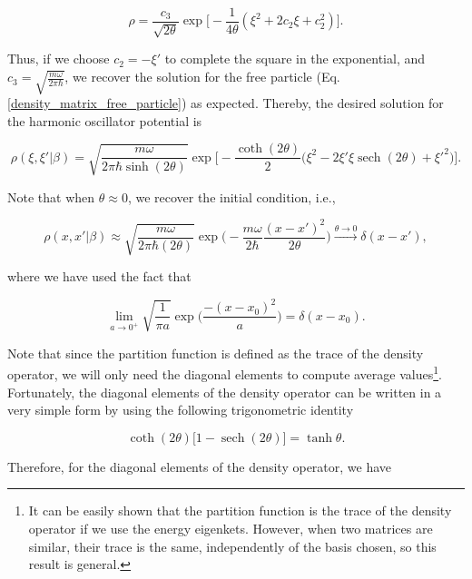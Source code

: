 \documentclass{article}
\DeclareMathOperator{\sech}{sech}
\begin{document}
\begin{equation}
    \rho = \frac{c_{3}}{\sqrt{2\theta}} \exp \big[ -\frac{1}{4\theta}(\xi^{2} + 2c_{2}\xi + c_{2}^{2}) \big].
\end{equation}

Thus, if we choose $c_{2}=-\xi'$ to complete the square in the exponential, and $c_{3} = \sqrt{\frac{m\omega}{2\pi \hbar}}$, we recover the solution for the free particle (Eq. \ref{density_matrix_free_particle}) as expected. Thereby, the desired solution for the harmonic oscillator potential is

\begin{equation}\label{harmonic_osc_density_matrix}
    \rho(\xi, \xi'|\beta) = \sqrt{\frac{m\omega}{2\pi \hbar \sinh(2\theta)}} \exp \Bigg[ -\frac{\coth(2\theta)}{2} \big( \xi^{2} - 2\xi' \xi \sech(2\theta) + \xi'^{2} \big) \Big].
\end{equation}

Note that when $\theta \approx 0$, we recover the initial condition, i.e.,

\begin{equation}
    \rho(x, x' | \beta) \approx \sqrt{\frac{m\omega}{2\pi\hbar (2\theta)}} \exp \bigg(- \frac{m\omega}{2\hbar} \frac{(x-x')^{2}}{2\theta} \bigg) \xrightarrow{\theta \longrightarrow 0} \delta(x-x'),
\end{equation}

where we have used the fact that

\begin{equation}
    \lim_{a \to 0^{+}} \sqrt{\frac{1}{\pi a}} \exp \bigg(\frac{-(x-x_{0})^{2}}{a} \bigg) = \delta(x-x_{0}).
\end{equation}

Note that since the partition function is defined as the trace of the density operator, we will only need the diagonal elements to compute average values\footnote{It can be easily shown that the partition function is the trace of the density operator if we use the energy eigenkets. However, when two matrices are similar, their trace is the same, independently of the basis chosen, so this result is general.}. Fortunately, the diagonal elements of the density operator can be written in a very simple form by using the following trigonometric identity

\begin{equation}
    \coth (2\theta) \big[1-\sech(2\theta) \big] = \tanh\theta.
\end{equation}

Therefore, for the diagonal elements of the density operator, we have 
\end{document}
